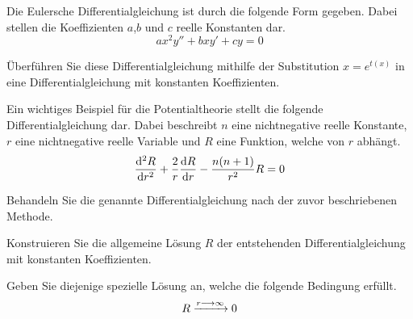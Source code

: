 \begin{atiTask}[
	title = Die homogene Euler-Gleichung,
	topic = Gewöhnliche Differentialgleichungen,
	subtopic = Die lineare homogene Differentialgleichung 2. Ordnung mit konstanten Koeffizienten,
	language = Deutsch,
]
	Die Eulersche Differentialgleichung ist durch die folgende Form gegeben.
	Dabei stellen die Koeffizienten $a$,$b$ und $c$ reelle Konstanten dar.
	\[
		ax^2y'' + bxy' + cy = 0
	\]
	\begin{atiSubtasks}
		\item{
			Überführen Sie diese Differentialgleichung mithilfe der Substitution $x = e^{t(x)}$ in eine Differentialgleichung mit konstanten Koeffizienten.
		}
		\item{
			Ein wichtiges Beispiel für die Potentialtheorie stellt die folgende Differentialgleichung dar.
			Dabei beschreibt $n$ eine nichtnegative reelle Konstante, $r$ eine nichtnegative reelle Variable und $R$ eine Funktion, welche von $r$ abhängt.
			\[
				\nfdrv[2]{R}{r} + \frac{2}{r}\nfdrv{R}{r} - \frac{n(n+1)}{r^2}R = 0
			\]
			\begin{atiSubsubtasks}
				\item{
					Behandeln Sie die genannte Differentialgleichung nach der zuvor beschriebenen Methode.
				}
				\item{
					Konstruieren Sie die allgemeine Lösung $R$ der entstehenden Differentialgleichung mit konstanten Koeffizienten.
				}
				\item{
					Geben Sie diejenige spezielle Lösung an, welche die folgende Bedingung erfüllt.
					\[
						R\conv[r\conv\infty]0
					\]
				}
			\end{atiSubsubtasks}
		}
	\end{atiSubtasks}
\end{atiTask}
